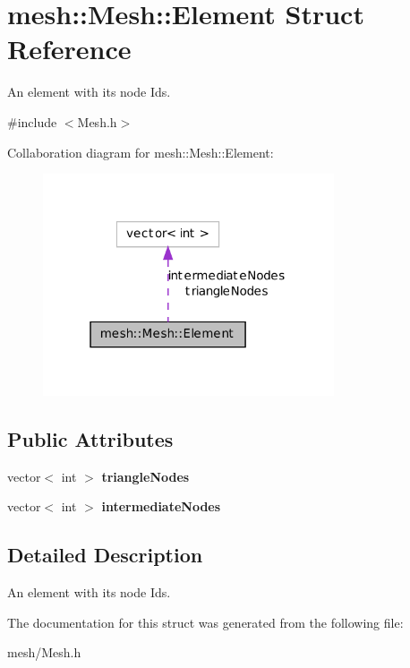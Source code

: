 \hypertarget{structmesh_1_1_mesh_1_1_element}{
\section{mesh::Mesh::Element Struct Reference}
\label{structmesh_1_1_mesh_1_1_element}
}


An element with its node Ids.  




{\ttfamily \#include $<$Mesh.h$>$}



Collaboration diagram for mesh::Mesh::Element:\nopagebreak
\begin{figure}[H]
\begin{center}
\leavevmode
\includegraphics[width=244pt]{structmesh_1_1_mesh_1_1_element__coll__graph}
\end{center}
\end{figure}
\subsection*{Public Attributes}
\begin{DoxyCompactItemize}
\item 
\hypertarget{structmesh_1_1_mesh_1_1_element_aaf33edc392c36b6be1757b42759c5392}{
vector$<$ int $>$ {\bfseries triangleNodes}}
\label{structmesh_1_1_mesh_1_1_element_aaf33edc392c36b6be1757b42759c5392}

\item 
\hypertarget{structmesh_1_1_mesh_1_1_element_a5cba271f3a925ae2567080b85f5d05b4}{
vector$<$ int $>$ {\bfseries intermediateNodes}}
\label{structmesh_1_1_mesh_1_1_element_a5cba271f3a925ae2567080b85f5d05b4}

\end{DoxyCompactItemize}


\subsection{Detailed Description}
An element with its node Ids. 

The documentation for this struct was generated from the following file:\begin{DoxyCompactItemize}
\item 
mesh/Mesh.h\end{DoxyCompactItemize}
